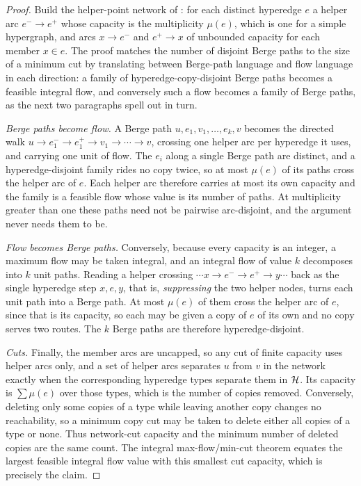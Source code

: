 \begin{proof}
Build the helper-point network of : for each distinct hyperedge $e$ a helper arc $e^- \to e^+$ whose capacity is the multiplicity $\mu(e)$, which is one for a simple hypergraph, and arcs $x \to e^-$ and $e^+ \to x$ of unbounded capacity for each member $x \in e$. The proof matches the number of disjoint Berge paths to the size of a minimum cut by translating between Berge-path language and flow language in each direction: a family of hyperedge-copy-disjoint Berge paths becomes a feasible integral flow, and conversely such a flow becomes a family of Berge paths, as the next two paragraphs spell out in turn.

\emph{Berge paths become flow.} A Berge path $u, e_1, v_1, \dots, e_k, v$ becomes the directed walk $u \to e_1^- \to e_1^+ \to v_1 \to \cdots \to v$, crossing one helper arc per hyperedge it uses, and carrying one unit of flow. The $e_i$ along a single Berge path are distinct, and a hyperedge-disjoint family rides no copy twice, so at most $\mu(e)$ of its paths cross the helper arc of $e$. Each helper arc therefore carries at most its own capacity and the family is a feasible flow whose value is its number of paths. At multiplicity greater than one these paths need not be pairwise arc-disjoint, and the argument never needs them to be.

\emph{Flow becomes Berge paths.} Conversely, because every capacity is an integer, a maximum flow may be taken integral, and an integral flow of value $k$ decomposes into $k$ unit paths. Reading a helper crossing $\cdots x \to e^- \to e^+ \to y \cdots$ back as the single hyperedge step $x, e, y$, that is, \emph{suppressing} the two helper nodes, turns each unit path into a Berge path. At most $\mu(e)$ of them cross the helper arc of $e$, since that is its capacity, so each may be given a copy of $e$ of its own and no copy serves two routes. The $k$ Berge paths are therefore hyperedge-disjoint.

\emph{Cuts.} Finally, the member arcs are uncapped, so any cut of finite capacity uses helper arcs only, and a set of helper arcs separates $u$ from $v$ in the network exactly when the corresponding hyperedge types separate them in $\mathcal{H}$. Its capacity is $\sum \mu(e)$ over those types, which is the number of copies removed. Conversely, deleting only some copies of a type while leaving another copy changes no reachability, so a minimum copy cut may be taken to delete either all copies of a type or none. Thus network-cut capacity and the minimum number of deleted copies are the same count. The integral max-flow/min-cut theorem equates the largest feasible integral flow value with this smallest cut capacity, which is precisely the claim.
\end{proof}

